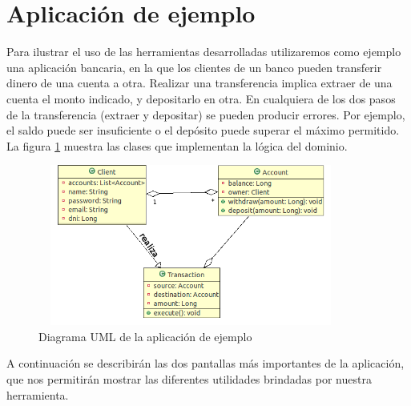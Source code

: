\section{Aplicación de ejemplo}
Para ilustrar el uso de las herramientas desarrolladas utilizaremos como ejemplo
una aplicación bancaria, en la que los clientes de un banco pueden transferir
dinero de una cuenta a otra. 
Realizar una transferencia implica extraer de una cuenta el
monto indicado, y depositarlo en otra. 
En cualquiera de los dos pasos de la transferencia (extraer y depositar) se
pueden producir errores.
Por ejemplo, el saldo puede ser insuficiente o el depósito puede superar el
máximo permitido.
La figura \ref{example} muestra las clases que implementan la lógica del
dominio.

	\begin{figure}[h!]
		\centering
		\includegraphics[width=380px, height=200px]{img/transaccion}
		\caption{Diagrama UML de la aplicación de ejemplo}
		\label{example}
	\end{figure}	

A continuación se describirán las dos pantallas más importantes de la
aplicación, que nos permitirán mostrar las diferentes utilidades brindadas por
nuestra herramienta.
 
